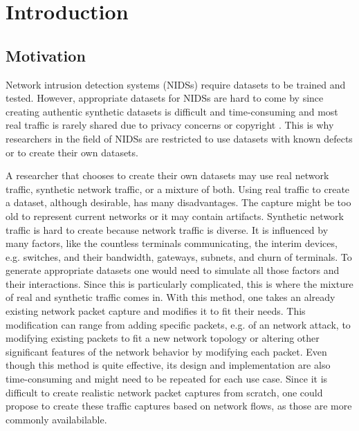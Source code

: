 \documentclass[
	ngerman,
	ruledheaders=section,%
	class=report,%
	thesis={type=bachelor},%
	accentcolor=9c,%
	custommargins=true,%
	marginpar=false,%
	parskip=half-,%
	fontsize=11pt,%
]{tudapub}
\begin{document}

\chapter{Introduction}

\section{Motivation}

Network intrusion detection systems (NIDSs) require datasets to be trained and tested.
However, appropriate datasets for NIDSs are hard to come by
since creating authentic synthetic datasets is difficult and time-consuming
and most real traffic is rarely shared due to privacy concerns \cite{ringFlowbasedNetworkTraffic2019a} or copyright \cite{corderoID2TDIYDataset2015}.
This is why researchers in the field of NIDSs are restricted to use datasets with known defects or to create their own datasets.

A researcher that chooses to create their own datasets may use real network traffic, synthetic network traffic, or a mixture of both.
Using real traffic to create a dataset, although desirable, has many disadvantages.
The capture might be too old to represent current networks or
it may contain artifacts.
Synthetic network traffic is hard to create because network traffic is diverse.
It is influenced by many factors, like
the countless terminals communicating,
the interim devices, e.g. switches, and their bandwidth,
gateways, subnets, and churn of terminals.
To generate appropriate datasets one would need to simulate all those factors and their interactions.
Since this is particularly complicated,
this is where the mixture of real and synthetic traffic comes in.
With this method, one takes an already existing network packet capture and modifies it to fit their needs.
This modification can range from adding specific packets, e.g. of an network attack\cite{corderoID2TDIYDataset2015},
to modifying existing packets to fit a new network topology
or altering other significant features of the network behavior by modifying each packet.
Even though this method is quite effective, its design and implementation are also time-consuming and might need to be repeated for each use case.
Since it is difficult to create realistic network packet captures from scratch,
one could propose to create these traffic captures based on network flows, as those are more commonly availabilable.
\end{document}
